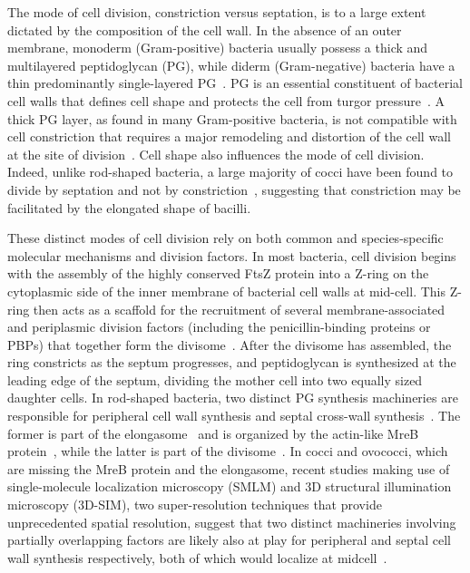 The mode of cell division, constriction versus septation, is to a large extent dictated by the composition of the cell wall.
In the absence of an outer membrane, monoderm (Gram-positive) bacteria usually possess a thick and multilayered peptidoglycan (PG), while diderm (Gram-negative) bacteria have a thin predominantly single-layered PG~\cite{}.
PG is an essential constituent of bacterial cell walls that defines cell shape and protects the cell from turgor pressure~\cite{gardePeptidoglycanStructureSynthesis2021}.
A thick PG layer, as found in many Gram-positive bacteria, is not compatible with cell constriction that requires a major remodeling and distortion of the cell wall at the site of division~\cite{nguyenSimulationsSuggestConstrictive2019}.
Cell shape also influences the mode of cell division.
Indeed, unlike rod-shaped bacteria, a large majority of cocci have been found to divide by septation and not by constriction~\cite{zapunDifferentShapesCocci2008,pinhoHowGetMechanisms2013}, suggesting that constriction may be facilitated by the elongated shape of bacilli.

These distinct modes of cell division rely on both common and species-specific molecular mechanisms and division factors.
In most bacteria, cell division begins with the assembly of the highly conserved FtsZ protein into a Z-ring on the cytoplasmic side of the inner membrane of bacterial cell walls at mid-cell.
This Z-ring then acts as a scaffold for the recruitment of several membrane-associated and periplasmic division factors (including the penicillin-binding proteins or PBPs) that together form the divisome~\cite{pinhoHowGetMechanisms2013}.
After the divisome has assembled, the ring constricts as the septum progresses, and peptidoglycan is synthesized at the leading edge of the septum, dividing the mother cell into two equally sized daughter cells.
In rod-shaped bacteria, two distinct PG synthesis machineries are responsible for peripheral cell wall synthesis and septal cross-wall synthesis~\cite{eganRegulationPeptidoglycanSynthesis2020}.
The former is part of the elongasome~\cite{eganRegulationPeptidoglycanSynthesis2020} and is organized by the actin-like MreB protein~\cite{eganRegulationBacterialCell2017}, while the latter is part of the divisome~\cite{duAssemblyActivationEscherichia2017,denblaauwenDivisome25Road2017}.
In cocci and ovococci, which are missing the MreB protein and the elongasome, recent studies making use of single-molecule localization microscopy (SMLM) and 3D structural illumination microscopy (3D-SIM), two super-resolution techniques that provide unprecedented spatial resolution, suggest that two distinct machineries involving partially overlapping factors are likely also at play for peripheral and septal cell wall synthesis respectively, both of which would localize at midcell~\cite{pinhoHowGetMechanisms2013,trouveNanoscaleDynamicsPeptidoglycan2021,perezOrganizationPeptidoglycanSynthesis2021,perez-nunezNewMorphogenesisPathway2011,lundMolecularCoordinationStaphylococcus2018}.

